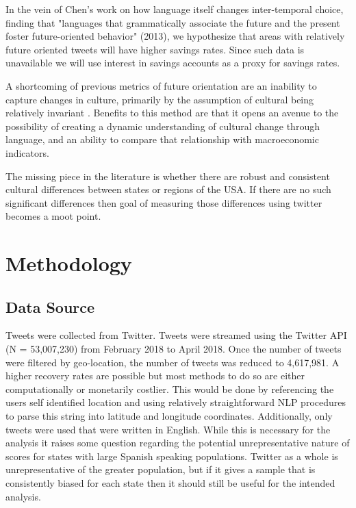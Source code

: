 \documentclass{article}
\begin{document}
In the vein of Chen's work on how language itself changes inter-temporal choice, finding that "languages that grammatically associate the future and the present foster future-oriented behavior" (2013), we hypothesize that areas with relatively future oriented tweets will have higher savings rates. Since such data is unavailable we will use interest in savings accounts as a proxy for savings rates. 

A shortcoming of previous metrics of future orientation are an inability to capture changes in culture, primarily by the assumption of cultural being relatively invariant \citep{tang2008framework}. Benefits to this method are that it opens an avenue to the possibility of creating a dynamic understanding of cultural change through language, and an ability to compare that relationship with macroeconomic indicators.

The missing piece in the literature is whether there are robust and consistent cultural differences between states or regions of the USA. If there are no such significant differences then goal of measuring those differences using twitter becomes a moot point. 

\section{Methodology}

\subsection{Data Source}
Tweets were collected from Twitter. 
Tweets were streamed using the Twitter API (N = 53,007,230) from February 2018 to April 2018. Once the number of tweets were filtered by geo-location, the number of tweets was reduced to 4,617,981. A higher recovery rates are possible but most methods to do so are either computationally or monetarily costlier. This would be done by referencing the users self identified location and using relatively straightforward NLP procedures to parse this string into latitude and longitude coordinates. Additionally, only tweets were used that were written in English. While this is necessary for the analysis it raises some question regarding the potential unrepresentative nature of scores for states with large Spanish speaking populations. Twitter as a whole is unrepresentative of the greater population, but if it gives a sample that is consistently biased for each state then it should still be useful for the intended analysis.  
\end{document}
